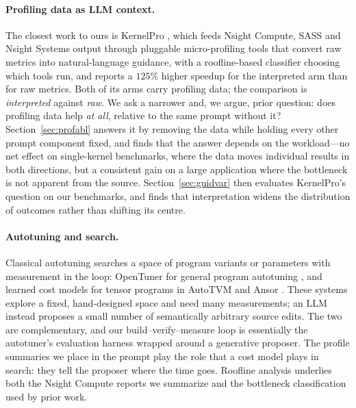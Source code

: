 \paragraph{Profiling data as LLM context.}
The closest work to ours is KernelPro \cite{gai2026kernelpro}, which feeds Nsight Compute, SASS and
Nsight Systems output through pluggable micro-profiling tools that convert raw metrics into
natural-language guidance, with a roofline-based classifier choosing which tools run, and reports a
$125\%$ higher speedup for the interpreted arm than for raw metrics. Both of its arms carry profiling
data; the comparison is \emph{interpreted} against \emph{raw}. We ask a narrower and, we argue, prior
question: does profiling data help \emph{at all}, relative to the same prompt without it?
Section~\ref{sec:profabl} answers it by removing the data while holding every other prompt component
fixed, and finds that the answer depends on the workload---no net effect on single-kernel
benchmarks, where the data moves individual results in both directions, but a consistent gain on a
large application where the bottleneck is not apparent from the source.
Section~\ref{sec:guidvar} then evaluates KernelPro's question on our benchmarks, and finds
that interpretation widens the distribution of outcomes rather than shifting its centre.

\paragraph{Autotuning and search.}
Classical autotuning searches a space of program variants or parameters with measurement in the loop:
OpenTuner for general program autotuning \cite{ansel2014opentuner}, and learned cost models for tensor
programs in AutoTVM \cite{chen2018autotvm} and Ansor \cite{zheng2020ansor}. These systems explore a
fixed, hand-designed space and need many measurements; an LLM instead proposes a small number of
semantically arbitrary source edits. The two are complementary, and our build--verify--measure loop is
essentially the autotuner's evaluation harness wrapped around a generative proposer. The profile
summaries we place in the prompt play the role that a cost model plays in search: they tell the
proposer where the time goes. Roofline analysis \cite{williams2009roofline} underlies both the
Nsight Compute reports we summarize and the bottleneck classification used by prior work.

